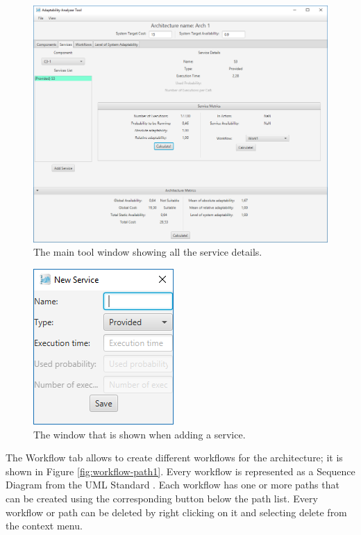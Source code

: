 \begin{figure}[!h]
	\centerline
	{\includegraphics[scale=0.50]{img/serv_details.png}}
	\caption[Service details tab]{The main tool window showing all the service details.}
	\label{fig:serv-details}
\end{figure}

\begin{figure}[!h]
	\centerline
	{\includegraphics[scale=0.6]{img/add_serv.png}}
	\caption[Add service window]{The window that is shown when adding a service.}
	\label{fig:add-serv}
\end{figure}

The Workflow tab allows to create different workflows for the architecture; it is shown in Figure \ref{fig:workflow-path1}. Every workflow is represented as a Sequence Diagram from the UML Standard \cite{uml}. Each workflow has one or more paths that can be created using the corresponding button below the path list. Every workflow or path can be deleted by right clicking on it and selecting delete from the context menu. 

